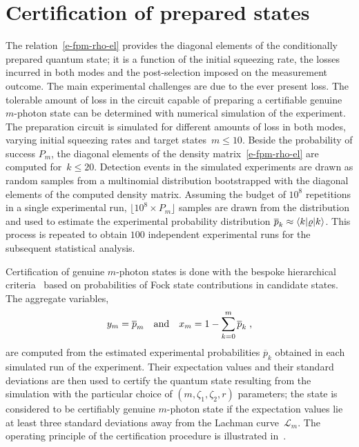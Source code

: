 \documentclass{article}
\begin{document}
\section{Certification of prepared states}

The relation~\eqref{e-fpm-rho-el} provides the diagonal elements of the conditionally prepared quantum state; it is a function of the initial squeezing rate, the losses incurred in both modes and the post-selection imposed on the measurement outcome. The main experimental challenges are due to the ever present loss. The tolerable amount of loss in the circuit capable of preparing a certifiable genuine $m$-photon state can be determined with numerical simulation of the experiment. The preparation circuit is simulated for different amounts of loss in both modes, varying initial squeezing rates and target states~${m \leq 10}$. Beside the probability of success $P_{m}$, the diagonal elements of the density matrix~\eqref{e-fpm-rho-el} are computed for~${k \leq 20}$. Detection events in the simulated experiments are drawn as random samples from a multinomial distribution bootstrapped with the diagonal elements of the computed density matrix. Assuming the budget of $10^{8}$ repetitions in a single experimental run, ${\lfloor 10^{8} \times P_{m} \rfloor}$ samples are drawn from the distribution and used to estimate the experimental probability distribution ${\overline{p}_{k} \approx \braket{k|\varrho|k}}$. This process is repeated to obtain $100$ independent experimental runs for the subsequent statistical analysis.

Certification of genuine $m$-photon states is done with the bespoke hierarchical criteria~\cite{lachman2019} based on probabilities of Fock state contributions in candidate states. The aggregate variables,
%
\begin{equation}
  y_{m} = \overline{p}_{m} 
  \quad\text{and}\quad
  x_{m} = 1 - \sum_{k = 0}^{m} \overline{p}_{k} 
  \;\text{,}
\end{equation}
%
are computed from the estimated experimental probabilities $\overline{p}_{k}$ obtained in each simulated run of the experiment. Their expectation values and their standard deviations are then used to certify the quantum state resulting from the simulation with the particular choice of $(m, \zeta_{1}, \zeta_{2}, r)$ parameters; the state is considered to be certifiably genuine $m$-photon state if the expectation values lie at least three standard deviations away from the Lachman curve~$\mathcal{L}_{m}$. The operating principle of the certification procedure is illustrated in~.
\end{document}
